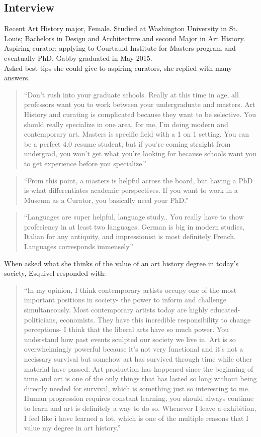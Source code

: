 \begin{multicols}{2}
\section{Interview}
	Recent Art History major, Female. Studied at Washington University in St. Louis; Bachelors in Design and Architecture and second Major in Art History. Aspiring curator; applying to Courtauld Institute for Masters program and eventually PhD. Gabby graduated in May 2015. \\ 
	Asked best tips she could give to aspiring curators, she replied with many answers.
	\begin{quote}
		“Don’t rush into your graduate schools. Really at this time in age, all professors want you to work between your undergraduate and masters. Art History and curating is complicated because they want to be selective. You should really specialize in one area, for me, I’m doing modern and contemporary art. Masters is specific field with a 1 on 1 setting. You can be a perfect 4.0 resume student, but if you’re coming straight from undergrad, you won’t get what you’re looking for because schools want you to get experience before you specialize.”
	\end{quote}
	\begin{quote} 
		“From this point, a masters is helpful across the board, but having a PhD is what differentiates academic perspectives. If you want to work in a Museum as a Curator, you basically need your PhD.”
	\end{quote}
	\begin{quote}
		“Languages are super helpful, language study.. You really have to show profeciency in at least two languages. German is big in modern studies, Italian for any antiquity, and impressionist is most definitely French. Languages corresponds immensely.”
	\end{quote}
	When asked what she thinks of the value of an art history degree in today’s society, Esquivel responded with:
	\begin{quote}
		“In my opinion, I think contemporary artists occupy one of the most important positions in society- the power to inform and challenge simultaneously. Most contemporary artists today are highly educated- politicians, economists. They have this incredible responsibility to change perceptions- I think that the liberal arts have so much power. You understand how past events sculpted our society we live in. Art is so overwhelmingly powerful because it’s not very functional and it’s not a necissary survival but somehow art has survived through time while other material have passed. Art production has happened since the beginning of time and art is one of the only things that has lasted so long without being directly needed for survival, which is something just so interesting to me. Human progression requires constant learning, you should always continue to learn and art is definitely a way to do so. Whenever I leave a exhibition, I feel like i have learned a lot, which is one of the multiple reasons that I value my degree in art history.”
	\end{quote}


\end{multicols}
